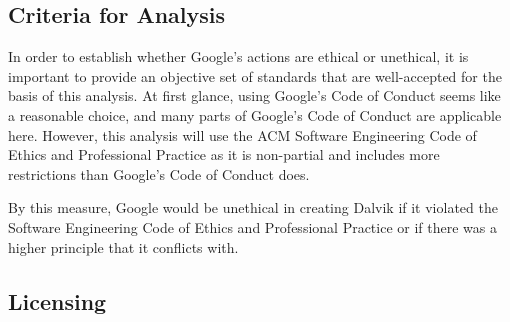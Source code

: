\documentclass[11pt]{article}
\begin{document}
\begin{multicols}{2}
%
%
%
%

\subsection{Criteria for Analysis} %
\label{sub:analysis_criteria}

In order to establish whether Google's actions are ethical or unethical, it is
important to provide an objective set of standards that are well-accepted for
the basis of this analysis.  At first glance, using Google's Code of Conduct
\cite{google-conduct} seems like a reasonable choice, and many parts of Google's
Code of Conduct are applicable here.  However, this analysis will use the ACM
Software Engineering Code of Ethics and Professional Practice \cite{secode} as
it is non-partial and includes more restrictions than Google's Code of Conduct
does.

By this measure, Google would be unethical in creating Dalvik if it violated the
Software Engineering Code of Ethics and Professional Practice \cite{secode} or
if there was a higher principle that it conflicts with.


\subsection{Licensing} %
\label{sub:analysis_licensing}


\end{multicols}
\end{document}
